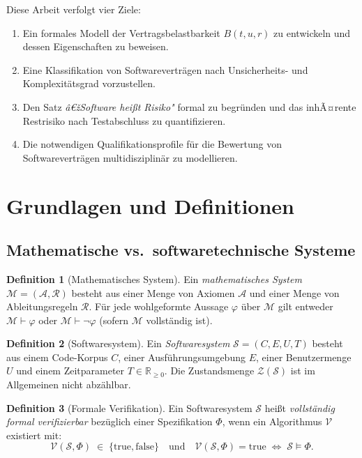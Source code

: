 ﻿\documentclass[a4paper,12pt]{article}
\theoremstyle{definition}
\newtheorem{definition}{Definition}
\begin{document}
Diese Arbeit verfolgt vier Ziele:
\begin{enumerate}
    \item Ein formales Modell der Vertragsbelastbarkeit $B(t, u, r)$ zu entwickeln und
          dessen Eigenschaften zu beweisen.
    \item Eine Klassifikation von Softwarevertr\"agen nach Unsicherheits- und
          Komplexit\"atsgrad vorzustellen.
    \item Den Satz \emph{â€žSoftware hei\ss{}t Risiko"} formal zu begr\"unden und das
          inhÃ¤rente Restrisiko nach Testabschluss zu quantifizieren.
    \item Die notwendigen Qualifikationsprofile f\"ur die Bewertung von Softwarevertr\"agen
          multidisziplin\"ar zu modellieren.
\end{enumerate}

\section{Grundlagen und Definitionen}

\subsection{Mathematische vs.\ softwaretechnische Systeme}

\begin{definition}[Mathematisches System]
    Ein \emph{mathematisches System} $\mathcal{M} = (\mathcal{A}, \mathcal{R})$ besteht aus
    einer Menge von Axiomen $\mathcal{A}$ und einer Menge von Ableitungsregeln $\mathcal{R}$.
    F\"ur jede wohlgeformte Aussage $\varphi$ \"uber $\mathcal{M}$ gilt entweder
    $\mathcal{M} \vdash \varphi$ oder $\mathcal{M} \vdash \neg\varphi$ (sofern $\mathcal{M}$
    vollst\"andig ist).
\end{definition}

\begin{definition}[Softwaresystem]
    Ein \emph{Softwaresystem} $\mathcal{S} = (C, E, U, T)$ besteht aus einem Code-Korpus
    $C$, einer Ausf\"uhrungsumgebung $E$, einer Benutzermenge $U$ und einem Zeitparameter
    $T \in \mathbb{R}_{\geq 0}$. Die Zustandsmenge $\mathcal{Z}(\mathcal{S})$ ist im
    Allgemeinen nicht abz\"ahlbar.
\end{definition}

\begin{definition}[Formale Verifikation]
    Ein Softwaresystem $\mathcal{S}$ hei\ss{}t \emph{vollst\"andig formal verifizierbar}
    bez\"uglich einer Spezifikation $\Phi$, wenn ein Algorithmus $\mathcal{V}$ existiert
    mit:
    \[
        \mathcal{V}(\mathcal{S}, \Phi) \;\in\; \{\text{true}, \text{false}\}
        \quad \text{und} \quad
        \mathcal{V}(\mathcal{S}, \Phi) = \text{true} \;\Leftrightarrow\; \mathcal{S} \models \Phi.
    \]
\end{definition}
\end{document}
